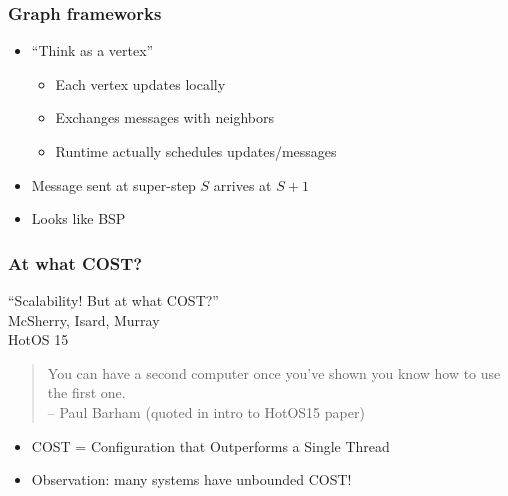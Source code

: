 \documentclass{beamer}
\begin{document}
\begin{frame}
  \frametitle{Graph frameworks}

  \begin{itemize}
  \item ``Think as a vertex''
    \begin{itemize}
    \item Each vertex updates locally
    \item Exchanges messages with neighbors
    \item Runtime actually schedules updates/messages
    \end{itemize}
  \item Message sent at super-step $S$ arrives at $S+1$
  \item Looks like BSP
  \end{itemize}
\end{frame}

\begin{frame}
  \frametitle{At what COST?}

  \begin{center}
    ``Scalability!  But at what COST?'' \\
    McSherry, Isard, Murray \\
    HotOS 15
  \end{center}

  \begin{quote}
    You can have a second computer once you've shown you know how to
    use the first one. \\ \hfill -- Paul Barham (quoted in intro to
    HotOS15 paper)
  \end{quote}
  \begin{itemize}
  \item COST = Configuration that Outperforms a Single Thread
  \item Observation: many systems have unbounded COST!
  \end{itemize}
\end{frame}
\end{document}
